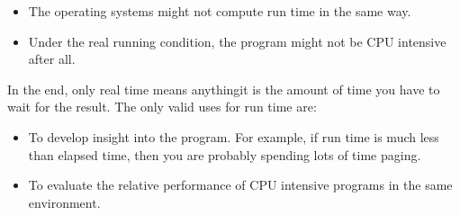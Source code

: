 \begin{itemize}  
\item The operating systems might not compute run time in the same
  way.
  
\item Under the real running condition, the program might not be CPU
  intensive after all.
\end{itemize}


In the end, only real time means anything\dash{}it is the amount of time you
have to wait for the result.  The only valid uses for run time are:

\begin{itemize}
\item To develop insight into the program.  For example, if run time
  is much less than elapsed time, then you are probably spending lots
  of time paging.
  
\item To evaluate the relative performance of CPU intensive programs
  in the same environment.
\end{itemize}
